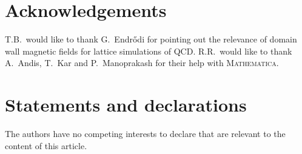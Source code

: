 \documentclass[pdflatex,iicol,sn-mathphys-num]{sn-jnl}
\begin{document}

\backmatter
\section*{Acknowledgements}

T.B.~would like to thank G.~Endr\H{o}di for pointing out the relevance of domain wall magnetic fields for lattice simulations of QCD. R.R.~would like to thank A.~Andis, T.~Kar and P.~Manoprakash for their help with \textsc{Mathematica}.


\section*{Statements and declarations}

The authors have no competing interests to declare that are relevant to the content of this article.

\end{document}

